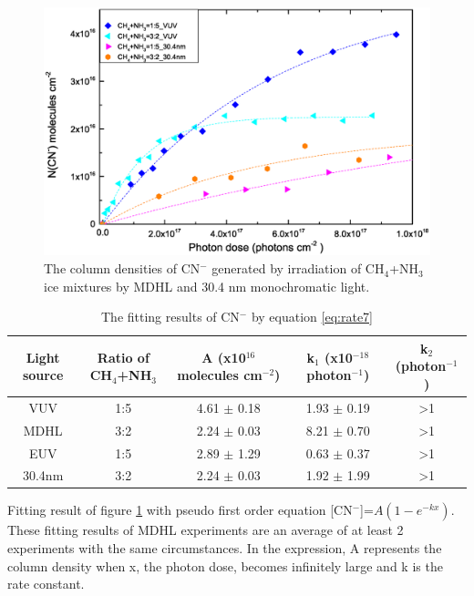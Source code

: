 \begin{figure}
\centering
\includegraphics[width=\textwidth]{figures/chapter3/overall_CN_NSRRC.eps}
\caption{The column densities of CN$^-$ generated by irradiation of CH$_4$+NH$_3$ ice mixtures by MDHL and 30.4 nm monochromatic light.}
\label{fig:CN_NSRRC}
\end{figure}

\begin{table}[htbp]
\caption{The fitting results of CN$^-$ by equation \ref{eq:rate7}}
\label{tab:CNrate_NSRRC}
\begin{tabular}{ccccc}
\hline
\hline
Light source & Ratio of CH$_4$+NH$_3$ & A (x10$^{16}$ molecules cm$^{-2}$) & k$_1$ (x10$^{-18}$ photon$^{-1}$) & k$_2$ (photon$^{-1}$)\\
\hline
VUV & 1:5 & 4.61 $\pm$ 0.18 & 1.93 $\pm$ 0.19 & >1 \\
MDHL & 3:2 & 2.24 $\pm$ 0.03 & 8.21 $\pm$ 0.70 & >1 \\
\hline
EUV & 1:5 & 2.89 $\pm$ 1.29 & 0.63 $\pm$ 0.37 & >1 \\
 30.4nm & 3:2 & 2.24 $\pm$ 0.03 & 1.92 $\pm$ 1.99 & >1 \\
\hline
\end{tabular}
Fitting result of figure \ref{fig:CN_NSRRC} with pseudo first order equation [CN$^-$]=$A(1-e^{-kx})$. These fitting results of MDHL experiments are an average of at least 2 experiments with the same circumstances. In the expression, A represents the column density when x, the photon dose, becomes infinitely large and k is the rate constant.\
\end{table}


